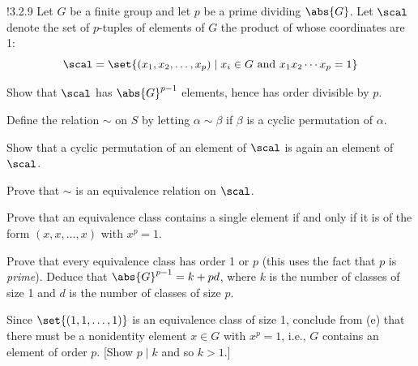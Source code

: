\begin{exercise}!{3.2.9}
    Let $G$ be a finite group and let $p$ be a prime dividing $\abs{G}$.
	Let $\scal$ denote the set of $p$-tuples of elements of $G$ the product of whose coordinates are 1:
    \[
    	\scal = \set{(x_1, x_2, \ldots, x_p) \mid x_i \in G \text{ and } x_1x_2 \cdots x_p = 1}
    \]
    \begin{subexercises}
        \item Show that $\scal$ has $\abs{G}^{p-1}$ elements, hence has order divisible by $p$.
    \end{subexercises}
    Define the relation $\sim$ on $S$ by letting $\alpha \sim \beta$ if $\beta$ is a cyclic permutation of $\alpha$.
    \begin{subexercises}[resume]
        \item Show that a cyclic permutation of an element of $\scal$ is again an element of $\scal$.
        \item Prove that $\sim$ is an equivalence relation on $\scal$.
        \item Prove that an equivalence class contains a single element if and only if it is of the form $(x, x, \dots, x)$ with $x^p = 1$.
        \item Prove that every equivalence class has order 1 or $p$ (this uses the fact that $p$ is \emph{prime}).
		Deduce that $\abs{G}^{p-1} = k + pd$, where $k$ is the number of classes of size 1 and $d$ is the number of classes of size $p$.
        \item Since $\set{(1, 1, \dots, 1)}$ is an equivalence class of size 1, conclude from (e) that there must be a nonidentity element $x \in G$ with $x^p = 1$, i.e., $G$ contains an element of order $p$. [Show $p \mid k$ and so $k > 1$.]
    \end{subexercises}
\end{exercise}

